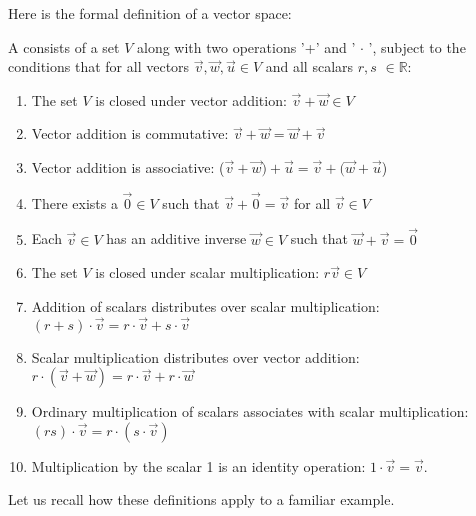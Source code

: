 Here is the formal definition of a vector space:

\begin{defn}
A  consists of a set $V$ along with two operations '+' and  ' $\cdot$ ', subject to the conditions that for all vectors $ \vec {v},\vec{w},\vec{u} \in V$ and all scalars $r, s$ $\in \mathbb{R}$:
\begin{enumerate} [(1)]
\item
The set $V$ is closed under vector addition: \quad  $\vec{v} + \vec{w} \in V$
\item
Vector addition is commutative: \quad  $\vec{v} + \vec{w} = \vec{w} + \vec{v}$
\item
Vector addition is associative: \quad ($\vec{v} + \vec{w}) + \vec{u} = \vec{v} + (\vec{w} + \vec{u}$)
\item
There exists a  $\vec{0} \in V$ such that $\vec{v} + \vec{0} = \vec{v}$ for all $\vec{v} \in V$
\item
Each $\vec{v} \in V$ has an additive inverse $\vec{w} \in V$ such that $\vec{w} + \vec{v} = \vec{0}$
\item
The set $V$ is closed under scalar multiplication: \quad  $ r  \vec{v} \in V$
\item
Addition of scalars distributes over scalar multiplication: \quad $(r+ s) \cdot \vec{v} = r \cdot \vec{v} + s \cdot \vec{v}$
\item
Scalar multiplication distributes over vector addition: \quad $ r \cdot( \vec{v} + \vec{w}) = r \cdot \vec{v} + r \cdot \vec{w}$
\item
Ordinary multiplication of scalars associates with scalar multiplication: \quad $(rs) \cdot \vec{v} = r \cdot (s \cdot \vec{v})$
\item
Multiplication by the scalar 1 is an identity operation: $1 \cdot \vec{v} = \vec{v}$.
\end{enumerate}

\end{defn}
Let us recall how these definitions apply to a familiar example.


